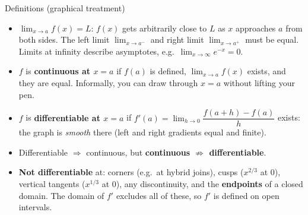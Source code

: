 \begin{defn}{Definitions (graphical treatment)}
\begin{itemize}
  \item $\displaystyle\lim_{x\to a}f(x)=L$: $f(x)$ gets arbitrarily close to $L$ as $x$ approaches $a$ from both sides. The left limit $\lim_{x\to a^-}$ and right limit $\lim_{x\to a^+}$ must be equal. Limits at infinity describe asymptotes, e.g.\ $\lim_{x\to\infty}e^{-x}=0$.
  \item $f$ is \textbf{continuous at $x=a$} if $f(a)$ is defined, $\lim_{x\to a}f(x)$ exists, and they are equal. Informally, you can draw through $x=a$ without lifting your pen.
  \item $f$ is \textbf{differentiable at $x=a$} if $f'(a)=\lim_{h\to0}\dfrac{f(a+h)-f(a)}{h}$ exists: the graph is \emph{smooth} there (left and right gradients equal and finite).
  \item Differentiable $\Rightarrow$ continuous, but \textbf{continuous $\not\Rightarrow$ differentiable}.
  \item \textbf{Not differentiable} at: corners (e.g.\ at hybrid joins), cusps ($x^{2/3}$ at $0$), vertical tangents ($x^{1/3}$ at $0$), any discontinuity, and the \textbf{endpoints} of a closed domain. The domain of $f'$ excludes all of these, so $f'$ is defined on open intervals.
\end{itemize}
\end{defn}

